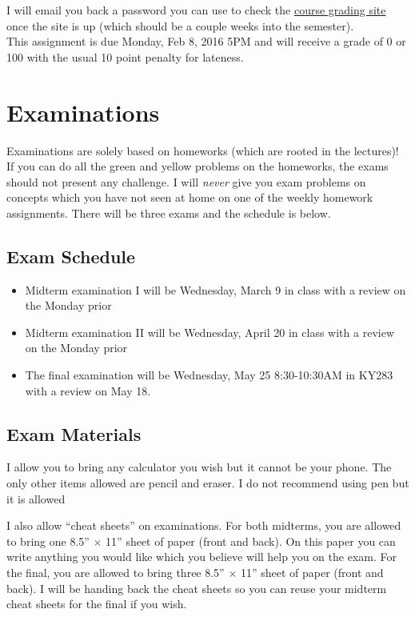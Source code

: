 \documentclass[12pt]{article}
\newcommand{\qu}[1]{``#1''}
\begin{document}
I will email you back a password you can use to check the \href{http://gradesly.com}{course grading site} once the site is up (which should be a couple weeks into the semester). \\

This assignment is due Monday, Feb 8, 2016 5PM and will receive a grade of 0 or 100 with the usual 10 point penalty for lateness.


\section*{Examinations}

Examinations are solely based on homeworks (which are rooted in the lectures)! If you can do all the green and yellow problems on the homeworks, the exams should not present any challenge. I will \textit{never} give you exam problems on concepts which you have not seen at home on one of the weekly homework assignments. There will be three exams and the schedule is below.

\subsection*{Exam Schedule}\label{subsec:exam_schedule}

\begin{itemize}
\itemsep -0.0em 
\item Midterm examination I will be Wednesday, March 9 in class with a review on the Monday prior
\item Midterm examination II will be Wednesday, April 20 in class with a review on the Monday prior
\item The final examination will be Wednesday, May 25 8:30-10:30AM in KY283 with a review on May 18.
\end{itemize}

\subsection*{Exam Materials}

I allow you to bring any calculator you wish but it cannot be your phone. The only other items allowed are pencil and eraser. I do not recommend using pen but it is allowed

I also allow \qu{cheat sheets} on examinations. For both midterms, you are allowed to bring one 8.5'' $\times$ 11'' sheet of paper (front and back). On this paper you can write anything you would like which you believe will help you on the exam. For the final, you are allowed to bring three 8.5'' $\times$ 11'' sheet of paper (front and back). I will be handing back the cheat sheets so you can reuse your midterm cheat sheets for the final if you wish. 
\end{document}
